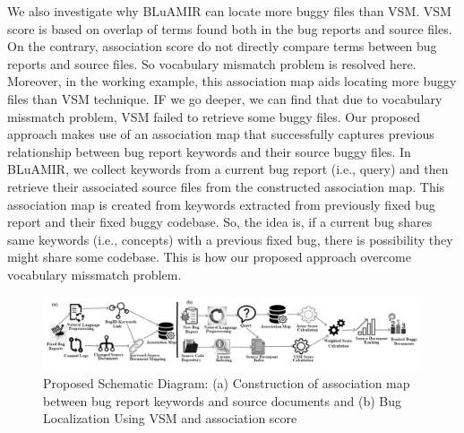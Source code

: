 \documentclass[conference]{IEEEtran}
\begin{document}
We also investigate why BLuAMIR can locate more buggy files than VSM.  
VSM score is based on overlap of terms found both in the bug reports and source files. On the contrary, association score do not directly compare terms between bug reports and source files. So vocabulary mismatch problem is resolved here. Moreover, in the working example, this association map aids locating more buggy files than VSM technique. IF we go deeper, we can find that due to vocabulary missmatch problem, VSM failed to retrieve some buggy files. Our proposed approach makes use of an association map that successfully captures previous relationship between bug report keywords and their source buggy files. 
In BLuAMIR, we collect keywords from a current bug report (i.e., query) and then retrieve their associated source files from the constructed association map. 
This association map is created from keywords extracted from previously fixed bug report and their fixed buggy codebase. So, the idea is, if a current bug shares same keywords (i.e., concepts) with a previous fixed bug, there is possibility they might share some codebase. This is how our proposed approach overcome vocabulary missmatch problem.

\begin{figure}
	\centering
	\includegraphics[scale=0.60]{SD-Feb04}
	\caption{Proposed Schematic Diagram: (a) Construction of association map between bug report keywords and source documents and (b) Bug Localization Using VSM and association score}
	\label{fig:systemDiagram}
\end{figure}
\end{document}
